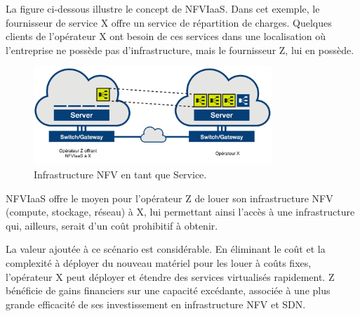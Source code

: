 La figure ci-dessous illustre le concept de NFVIaaS. Dans cet exemple, le fournisseur de service X offre un service de répartition de charges. Quelques clients de l'opérateur X ont besoin de ces services dans une localisation où l'entreprise ne possède pas d'infrastructure, mais le fournisseur Z, lui en possède.\\



\begin{figure}[h]
\begin{center}
\includegraphics[width=0.8\textwidth]{images/NFVIaaS} 
\caption{Infrastructure NFV en tant que Service. \cite{OFSDNNFVand}} \label{nfviaas}
\end{center}
\end{figure} 

NFVIaaS offre le moyen pour l'opérateur Z de louer son infrastructure NFV (compute, stockage, réseau) à X, lui permettant ainsi l'accès à une infrastructure qui, ailleurs, serait d'un coût prohibitif à obtenir.

La valeur ajoutée à ce scénario est considérable. En éliminant le coût et la complexité à déployer du nouveau matériel pour les louer à coûts fixes, l'opérateur X peut déployer et étendre des services virtualisés rapidement. Z bénéficie de gains financiers sur une capacité excédante, associée à une plus grande efficacité de ses investissement en infrastructure NFV et SDN.


